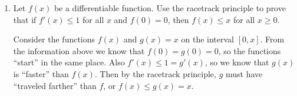 \documentclass[11pt]{article}
\begin{document}
\begin{enumerate}
\begin{enumerate}
    \vfill
  \end{enumerate}
  \newpage
  
\item Let $f(x)$ be a differentiable function.  Use the racetrack
  principle to prove that if $f'(x)\leq 1$ for all $x$ and $f(0)=0$,
  then $f(x)\leq x$ for all $x\geq 0$.

  \vfill

  Consider the functions $f(x)$ and $g(x)=x$ on the interval $[0,x]$.
  From the information above we know that $f(0)=g(0)=0$, so the
  functions ``start'' in the same place.  Also $f'(x)\leq 1=g'(x)$, so
  we know that $g(x)$ is ``faster'' than $f(x)$.  Then by the
  racetrack principle, $g$ must have ``traveled farther'' than $f$, or
  $f(x)\leq g(x) = x$.

  \vfill

\end{enumerate}
\end{document}
